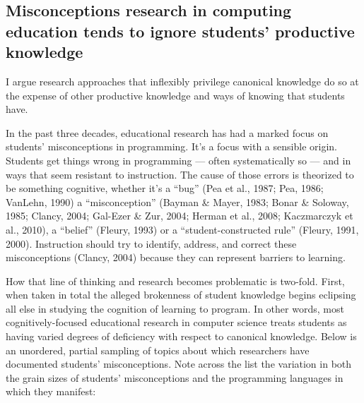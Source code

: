 \subsection{Misconceptions research in computing education tends to
ignore students' productive
knowledge}\label{misconceptions-research-in-computing-education-tends-to-ignore-students-productive-knowledge}

I argue research
approaches that inflexibly privilege canonical knowledge do so at the
expense of other productive knowledge and ways of knowing that students
have.

In the past three decades, educational research has had a marked focus
on students' misconceptions in programming. It's a focus with a sensible
origin. Students get things wrong in programming --- often
systematically so --- and in ways that seem resistant to instruction.
The cause of those errors is theorized to be something cognitive,
whether it's a ``bug'' \cite{pea_buggy_1987} (Pea et al., 1987; Pea, 1986; VanLehn, 1990) a
``misconception'' (Bayman \& Mayer, 1983; Bonar \& Soloway, 1985;
Clancy, 2004; Gal-Ezer \& Zur, 2004; Herman et al., 2008; Kaczmarczyk et
al., 2010), a ``belief'' (Fleury, 1993) or a ``student-constructed
rule'' (Fleury, 1991, 2000). Instruction should try to identify,
address, and correct these misconceptions (Clancy, 2004) because they
can represent barriers to learning.

How that line of thinking and research becomes problematic is two-fold.
First, when taken in total the alleged brokenness of student knowledge
begins eclipsing all else in studying the cognition of learning to
program. In other words, most cognitively-focused educational research
in computer science treats students as having varied degrees of
deficiency with respect to canonical knowledge. Below is an unordered,
partial sampling of topics about which researchers have documented
students' misconceptions. Note across the list the variation in both the
grain sizes of students' misconceptions and the programming languages in
which they manifest:

